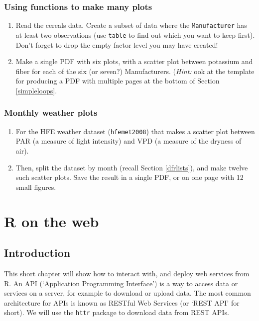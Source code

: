 \documentclass[]{book}
\begin{document}
\hypertarget{using-functions-to-make-many-plots}{%
\subsection{Using functions to make many plots}\label{using-functions-to-make-many-plots}}

\begin{enumerate}
\def\labelenumi{\arabic{enumi}.}
\item
  Read the cereals data. Create a subset of data where the \texttt{Manufacturer} has at least two observations (use \texttt{table} to find out which you want to keep first). Don't forget to drop the empty factor level you may have created!
\item
  Make a single PDF with six plots, with a scatter plot between potassium and fiber for each of the six (or seven?) Manufacturers. (\emph{Hint:} ook at the template for producing a PDF with multiple pages at the bottom of Section \ref{simpleloops}.
\end{enumerate}

\hypertarget{monthly-weather-plots}{%
\subsection{Monthly weather plots}\label{monthly-weather-plots}}

\begin{enumerate}
\def\labelenumi{\arabic{enumi}.}
\item
  For the HFE weather dataset (\texttt{hfemet2008}) that makes a scatter plot between PAR (a measure of light intensity) and VPD (a measure of the dryness of air).
\item
  Then, split the dataset by month (recall Section \ref{dfrlists}), and make twelve such scatter plots. Save the result in a single PDF, or on one page with 12 small figures.
\end{enumerate}

\hypertarget{webservices}{%
\chapter{R on the web}\label{webservices}}

\hypertarget{introduction-2}{%
\section{Introduction}\label{introduction-2}}

This short chapter will show how to interact with, and deploy web services from R. An API (`Application Programming Interface') is a way to access data or services on a server, for example to download or upload data. The most common architecture for APIs is known as RESTful Web Services (or `REST API' for short). We will use the \texttt{httr} package to download data from REST APIs.
\end{document}
